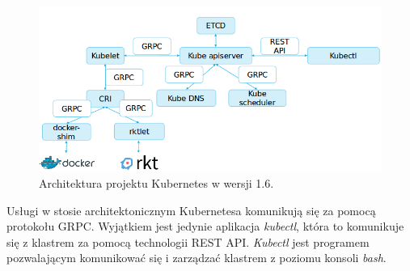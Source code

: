 \documentclass[10pt,a4paper,titlepage,twoside]{report}
\begin{document}
\begin{figure}[!h]
	\centering
	\includegraphics[scale=0.7]{pics/k8s_1_6.png}
	\caption{Architektura projektu Kubernetes w wersji 1.6.}
	\label{k8s_1_6}
\end{figure}

Usługi w stosie architektonicznym Kubernetesa komunikują się za pomocą protokołu GRPC. Wyjątkiem jest jedynie aplikacja \textit{kubectl}, która to komunikuje się z klastrem za pomocą technologii REST API. \textit{Kubectl} jest programem pozwalającym komunikować się i zarządzać klastrem z poziomu konsoli \textit{bash}.
\end{document}
